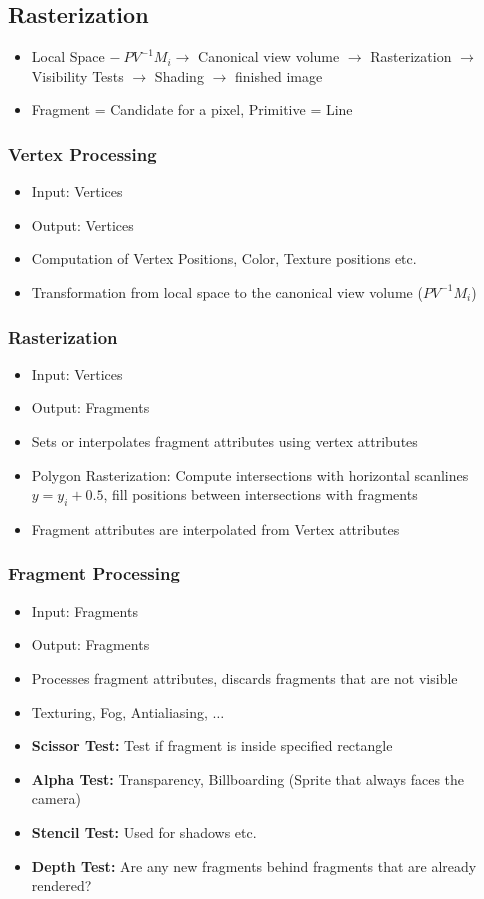 \documentclass{scrartcl}
\begin{document}
\subsection*{Rasterization}
\begin{itemize}
    \item Local Space $-\ PV^{-1} M_i \to$ Canonical view volume $\to$ Rasterization $\to$ Visibility Tests $\to$ Shading $\to$ finished image
    \item Fragment = Candidate for a pixel, Primitive = Line
\end{itemize}
\subsubsection*{Vertex Processing}
\begin{itemize}
    \item Input: Vertices
    \item Output: Vertices
    \item Computation of Vertex Positions, Color, Texture positions etc.
    \item Transformation from local space to the canonical view volume ($PV^{-1}M_i$)
\end{itemize}
\subsubsection*{Rasterization}
\begin{itemize}
    \item Input: Vertices
    \item Output: Fragments
    \item Sets or interpolates fragment attributes using vertex attributes
    \item Polygon Rasterization: Compute intersections with horizontal scanlines $y = y_i + 0.5$, fill positions between intersections with fragments
    \item Fragment attributes are interpolated from Vertex attributes
\end{itemize}
\subsubsection*{Fragment Processing}
\begin{itemize}
    \item Input: Fragments
    \item Output: Fragments
    \item Processes fragment attributes, discards fragments that are not visible
    \item Texturing, Fog, Antialiasing, $\hdots$
    \item \textbf{Scissor Test:} Test if fragment is inside specified rectangle
    \item \textbf{Alpha Test:} Transparency, Billboarding (Sprite that always faces the camera)
    \item \textbf{Stencil Test:} Used for shadows etc.
    \item \textbf{Depth Test:} Are any new fragments behind fragments that are already rendered?
\end{itemize}
\end{document}
